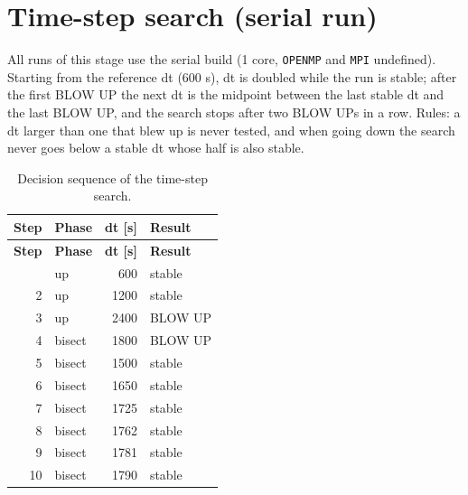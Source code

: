 \documentclass[10pt,a4paper]{article}
\begin{document}
\section{Time-step search (serial run)}
All runs of this stage use the serial build (1 core, \texttt{OPENMP} and \texttt{MPI} undefined). Starting from the reference dt (600 s), dt is doubled while the run is stable; after the first BLOW UP the next dt is the midpoint between the last stable dt and the last BLOW UP, and the search stops after two BLOW UPs in a row. Rules: a dt larger than one that blew up is never tested, and when going down the search never goes below a stable dt whose half is also stable.

{\footnotesize{}
\begin{longtable}{rlrl}
\caption{Decision sequence of the time-step search.}\\
\toprule
\textbf{Step} & \textbf{Phase} & \textbf{dt [s]} & \textbf{Result} \\
\midrule
\endfirsthead
\toprule
\textbf{Step} & \textbf{Phase} & \textbf{dt [s]} & \textbf{Result} \\
\midrule
\endhead
\bottomrule
\endfoot
1 & up & 600 & stable \\
2 & up & 1200 & stable \\
3 & up & 2400 & BLOW UP \\
4 & bisect & 1800 & BLOW UP \\
5 & bisect & 1500 & stable \\
6 & bisect & 1650 & stable \\
7 & bisect & 1725 & stable \\
8 & bisect & 1762 & stable \\
9 & bisect & 1781 & stable \\
10 & bisect & 1790 & stable \\
\end{longtable}}
\end{document}
